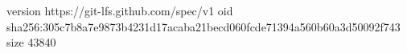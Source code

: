 version https://git-lfs.github.com/spec/v1
oid sha256:305c7b8a7e9873b4231d17acaba21becd060fcde71394a560b60a3d50092f743
size 43840
